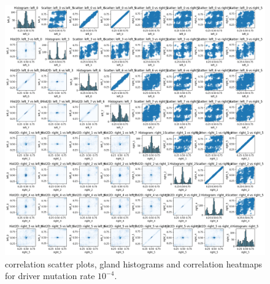\begin{figure}[h]
    \centering
    \includegraphics[width=\textwidth]{Chapter_5/figures/sensitivity_driver2.png}
    \caption{correlation scatter plots, gland histograms and correlation heatmaps for driver mutation rate $10^{-4}$.}
    \label{fig:sensitivity_driver2}
\end{figure}
\clearpage
